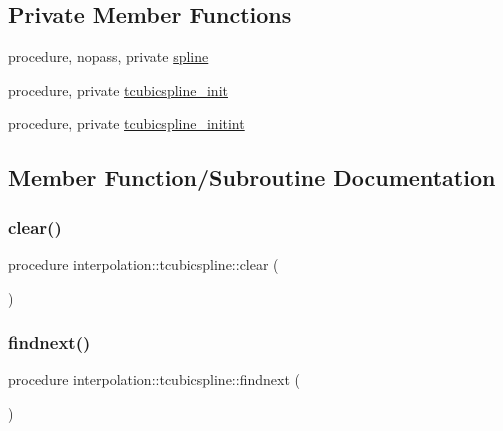 \subsection*{Private Member Functions}
\begin{DoxyCompactItemize}
\item 
procedure, nopass, private \mbox{\hyperlink{structinterpolation_1_1tcubicspline_ab13d6a8135c14c075069e89f0727eb0d}{spline}}
\item 
procedure, private \mbox{\hyperlink{structinterpolation_1_1tcubicspline_a192c42fc0b10bd2aac67816e8304cf6f}{tcubicspline\+\_\+init}}
\item 
procedure, private \mbox{\hyperlink{structinterpolation_1_1tcubicspline_a199574faf60d20d8a50703dcf1719093}{tcubicspline\+\_\+initint}}
\end{DoxyCompactItemize}


\subsection{Member Function/\+Subroutine Documentation}
\mbox{\label{structinterpolation_1_1tcubicspline_a18dd913c3081a31e4f74b0ef9f31c35e}} 
\subsubsection{\texorpdfstring{clear()}{clear()}}
{\footnotesize\ttfamily procedure interpolation\+::tcubicspline\+::clear (\begin{DoxyParamCaption}{ }\end{DoxyParamCaption})}

\mbox{\label{structinterpolation_1_1tcubicspline_a8ab425acf85d48f32f0afddb70591940}} 
\subsubsection{\texorpdfstring{findnext()}{findnext()}}
{\footnotesize\ttfamily procedure interpolation\+::tcubicspline\+::findnext (\begin{DoxyParamCaption}{ }\end{DoxyParamCaption})}

